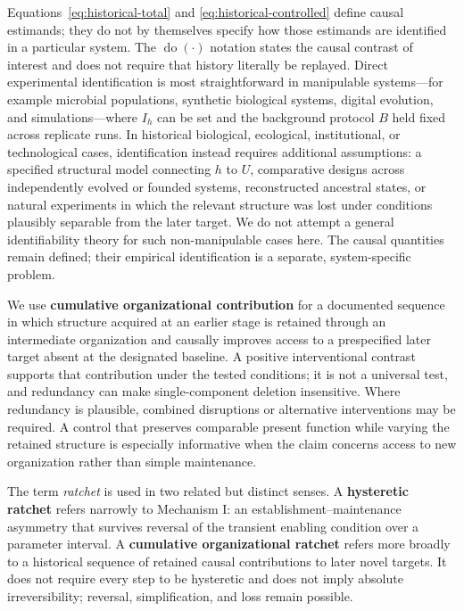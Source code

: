 \documentclass[11pt,a4paper]{article}
\begin{document}
Equations~\eqref{eq:historical-total} and \eqref{eq:historical-controlled} define causal estimands; they do not by themselves specify how those estimands are identified in a particular system. The $\operatorname{do}(\cdot)$ notation states the causal contrast of interest and does not require that history literally be replayed. Direct experimental identification is most straightforward in manipulable systems---for example microbial populations, synthetic biological systems, digital evolution, and simulations---where $I_h$ can be set and the background protocol $B$ held fixed across replicate runs. In historical biological, ecological, institutional, or technological cases, identification instead requires additional assumptions: a specified structural model connecting $h$ to $U$, comparative designs across independently evolved or founded systems, reconstructed ancestral states, or natural experiments in which the relevant structure was lost under conditions plausibly separable from the later target. We do not attempt a general identifiability theory for such non-manipulable cases here. The causal quantities remain defined; their empirical identification is a separate, system-specific problem.

We use \textbf{cumulative organizational contribution} for a documented sequence in which structure acquired at an earlier stage is retained through an intermediate organization and causally improves access to a prespecified later target absent at the designated baseline. A positive interventional contrast supports that contribution under the tested conditions; it is not a universal test, and redundancy can make single-component deletion insensitive. Where redundancy is plausible, combined disruptions or alternative interventions may be required. A control that preserves comparable present function while varying the retained structure is especially informative when the claim concerns access to new organization rather than simple maintenance.

The term \emph{ratchet} is used in two related but distinct senses. A \textbf{hysteretic ratchet} refers narrowly to Mechanism I: an establishment--maintenance asymmetry that survives reversal of the transient enabling condition over a parameter interval. A \textbf{cumulative organizational ratchet} refers more broadly to a historical sequence of retained causal contributions to later novel targets. It does not require every step to be hysteretic and does not imply absolute irreversibility; reversal, simplification, and loss remain possible.
\end{document}
